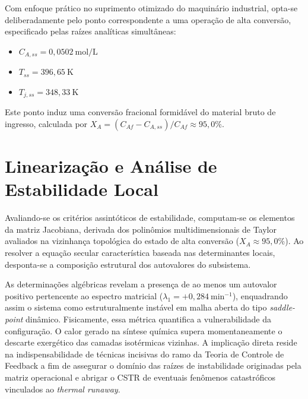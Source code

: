 Com enfoque prático no suprimento otimizado do maquinário industrial, opta-se deliberadamente pelo ponto correspondente a uma operação de alta conversão, especificado pelas raízes analíticas simultâneas:
\begin{itemize}
    \item $C_{A,ss} = 0,0502\ \si{\mole\per\liter}$
    \item $T_{ss} = 396,65\ \si{\kelvin}$
    \item $T_{j,ss} = 348,33\ \si{\kelvin}$
\end{itemize}
Este ponto induz uma conversão fracional formidável do material bruto de ingresso, calculada por $X_A = (C_{Af} - C_{A,ss})/C_{Af} \approx 95,0\%$.

\section{Linearização e Análise de Estabilidade Local}
\label{sec:linearizacao}

Avaliando-se os critérios assintóticos de estabilidade, computam-se os elementos da matriz Jacobiana, derivada dos polinômios multidimensionais de Taylor avaliados na vizinhança topológica do estado de alta conversão ($X_A \approx 95,0\%$). Ao resolver a equação secular característica baseada nas determinantes locais, desponta-se a composição estrutural dos autovalores do subsistema. 

As determinações algébricas revelam a presença de ao menos um autovalor positivo pertencente ao espectro matricial ($\lambda_1 = +0,284\ \si{\minute^{-1}}$), enquadrando assim o sistema como estruturalmente instável em malha aberta do tipo \textit{saddle-point} dinâmico. Fisicamente, essa métrica quantifica a vulnerabilidade da configuração. O calor gerado na síntese química supera momentaneamente o descarte exergético das camadas isotérmicas vizinhas. A implicação direta reside na indispensabilidade de técnicas incisivas do ramo da Teoria de Controle de Feedback a fim de assegurar o domínio das raízes de instabilidade originadas pela matriz operacional e abrigar o CSTR de eventuais fenômenos catastróficos vinculados ao \textit{thermal runaway}.
